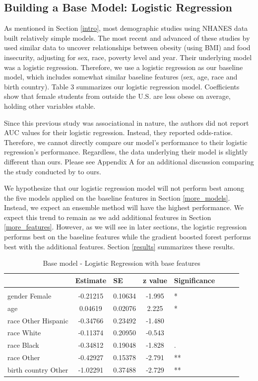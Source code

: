 \documentclass[twoside,11pt]{article}
\begin{document}
\subsection{Building a Base Model: Logistic Regression}\label{lr}
As mentioned in Section \ref{intro}, most demographic studies using NHANES data built relatively simple models. The most recent and advanced of these studies by \cite{kaur:17} used similar data to uncover relationships between obesity (using BMI) and food insecurity, adjusting for sex, race, poverty level and year. Their underlying model was a logistic regression. Therefore, we use a logistic regression as our baseline model, which includes somewhat similar baseline features (sex, age, race and birth country). Table 3 summarizes our logistic regression model. Coefficients show that female students from outside the U.S. are less obese on average, holding other variables stable. 

Since this previous study was associational in nature, the authors did not report AUC values for their logistic regression. Instead, they reported odds-ratios. Therefore, we cannot directly compare our model's performance to their logistic regression's performance. Regardless, the data underlying their model is slightly different than ours. Please see Appendix A for an additional discussion comparing the study conducted by \cite{kaur:17} to ours.

We hypothesize that our logistic regression model will not perform best among the five models applied on the baseline features in Section \ref{more_models}. Instead, we expect an ensemble method will have the highest performance. We expect this trend to remain as we add additional features in Section \ref{more_features}. However, as we will see in later sections, the logistic regression performs best on the baseline features while the gradient boosted forest performs best with the additional features. Section \ref{results} summarizes these results.

\begin{table}[h]
  \centering 
  \begin{tabular}{lclclclc} 
     & Estimate & SE & z value & Significance \\ 
    \hline \\[-11pt]
    gender Female & -0.21215 & 0.10634 & -1.995 & * \\
    age & 0.04619 &  0.02076 & 2.225 & *\\
    race Other Hispanic & -0.34766 & 0.23492 & -1.480 &  \\
    race White & -0.11374 & 0.20950 & -0.543  &\\
    race Black & -0.34812 & 0.19048 & -1.828  & .  \\
    race Other & -0.42927 & 0.15378 & -2.791  & ** \\
    birth country Other & -1.02291 & 0.37488 & -2.729 & ** \\ \hline 
  \end{tabular}
  \label{tab:example} 
    \caption{Base model - Logistic Regression with base features} 
\end{table}
\end{document}
